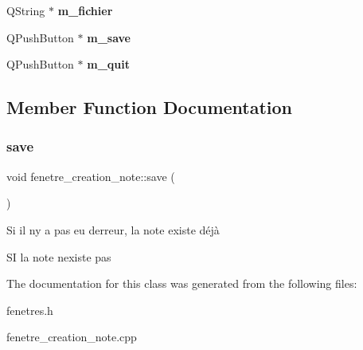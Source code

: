 \begin{DoxyCompactItemize}
\mbox{\label{classfenetre__creation__note_ada8843b6be5dd2dff4d99fade6bfada4}} 
Q\+String $\ast$ {\bfseries m\+\_\+fichier}
\item 
\mbox{\label{classfenetre__creation__note_adfe8b007cfc3075e77c3a1030571cbf5}} 
Q\+Push\+Button $\ast$ {\bfseries m\+\_\+save}
\item 
\mbox{\label{classfenetre__creation__note_ab3d04eb71646774146d2c12e8f0a53ec}} 
Q\+Push\+Button $\ast$ {\bfseries m\+\_\+quit}
\end{DoxyCompactItemize}


\subsection{Member Function Documentation}
\mbox{\label{classfenetre__creation__note_a148abe3a7d3ba11210f456d4cddce196}} 
\subsubsection{\texorpdfstring{save}{save}}
{\footnotesize\ttfamily void fenetre\+\_\+creation\+\_\+note\+::save (\begin{DoxyParamCaption}{ }\end{DoxyParamCaption})\hspace{0.3cm}{\ttfamily [slot]}}

Si il n\textquotesingle{}y a pas eu d\textquotesingle{}erreur, la note existe déjà

SI la note n\textquotesingle{}existe pas 

The documentation for this class was generated from the following files\+:\begin{DoxyCompactItemize}
\item 
fenetres.\+h\item 
fenetre\+\_\+creation\+\_\+note.\+cpp\end{DoxyCompactItemize}
